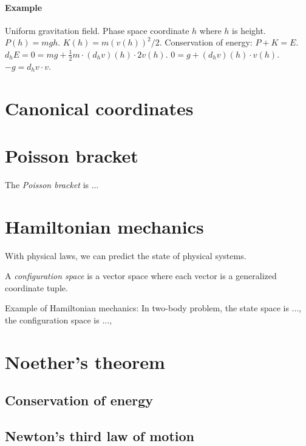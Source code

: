 \paragraph{Example}
Uniform gravitation field.
Phase space coordinate \(h\) where \(h\) is height.
\(P(h) = m g h\).
\(K(h) = m (v(h))^2 / 2\).
Conservation of energy: \(P + K = E\).
\(d_h E = 0 = m g + \frac{1}{2} m \cdot (d_h v)(h) \cdot 2 v(h)\).
\(0 = g + (d_h v)(h) \cdot v(h)\).
\(- g = d_h v \cdot v\).

\section{Canonical coordinates}

\section{Poisson bracket}

The \emph{Poisson bracket} is ...

\section{Hamiltonian mechanics}

With physical laws, we can predict the state of physical systems.

A
%
\emph{configuration space} is a vector space where each vector is a generalized coordinate tuple.

Example of Hamiltonian mechanics:
In two-body problem,
the state space is ...,
the configuration space is ...,

\section{Noether's theorem}

\subsection{Conservation of energy}

\subsection{Newton's third law of motion}
